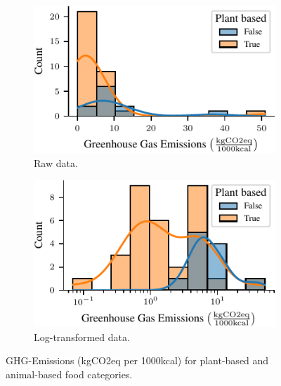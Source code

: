 \documentclass{article}
\begin{document}
\begin{figure}[h]
  \centering
  \begin{subfigure}[b]{0.49\textwidth}
    \includegraphics[width=\textwidth]{figures/ghg.pdf}
    \caption{Raw data.}
    \label{fig:ghg}
  \end{subfigure}%
  \hfill
  \begin{subfigure}[b]{0.49\textwidth}
    \includegraphics[width=\textwidth]{figures/ghg-log.pdf}
    \caption{Log-transformed data.}
    \label{fig:ghg-log}
  \end{subfigure}
  \caption{GHG-Emissions (kgCO2eq per 1000kcal) for plant-based and animal-based food categories.}
  \label{fig:ghg-combined}
\end{figure}

\end{document}
